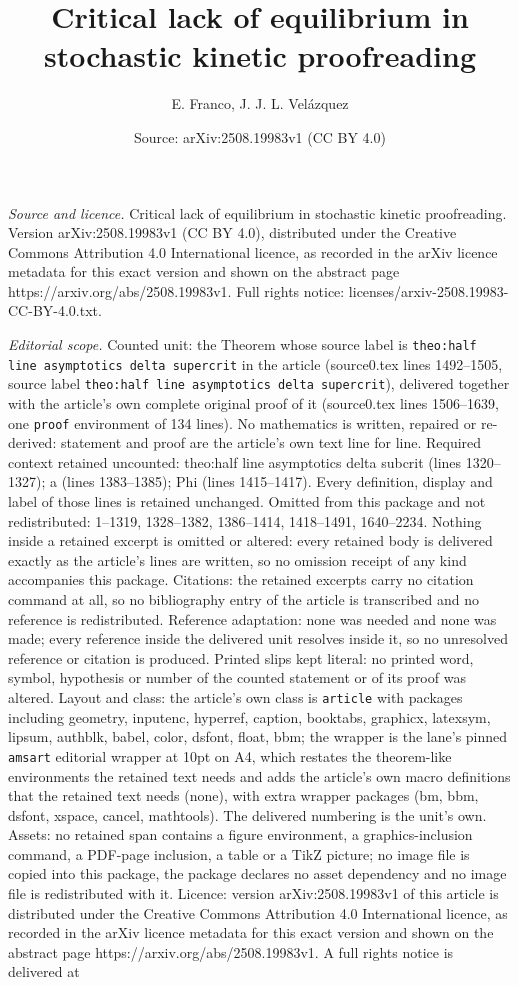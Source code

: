 \documentclass[10pt,a4paper]{amsart}
\title[Critical lack of equilibrium in stochastic kinetic proofread]{Critical lack of equilibrium in stochastic kinetic proofreading}
\author{E. Franco, J. J. L. Vel\'azquez}
\date{Source: arXiv:2508.19983v1 (CC BY 4.0)}
\begin{document}
\maketitle

\noindent\emph{Source and licence.} Critical lack of equilibrium in stochastic kinetic proofreading. Version arXiv:2508.19983v1 (CC BY 4.0), distributed under the Creative Commons Attribution 4.0 International licence, as recorded in the arXiv licence metadata for this exact version and shown on the abstract page https://arxiv.org/abs/2508.19983v1. Full rights notice: licenses/arxiv-2508.19983-CC-BY-4.0.txt.\par\smallskip

\noindent\textit{Editorial scope.} Counted unit: the Theorem whose source label is \texttt{theo:half line asymptotics delta supercrit} in the article (source0.tex lines 1492--1505, source label \texttt{theo:half line asymptotics delta supercrit}), delivered together with the article's own complete original proof of it (source0.tex lines 1506--1639, one \texttt{proof} environment of 134 lines). No mathematics is written, repaired or re-derived: statement and proof are the article's own text line for line. Required context retained uncounted: theo:half line asymptotics delta subcrit (lines 1320--1327); a (lines 1383--1385); Phi (lines 1415--1417). Every definition, display and label of those lines is retained unchanged. Omitted from this package and not redistributed: 1--1319, 1328--1382, 1386--1414, 1418--1491, 1640--2234. Nothing inside a retained excerpt is omitted or altered: every retained body is delivered exactly as the article's lines are written, so no omission receipt of any kind accompanies this package. Citations: the retained excerpts carry no citation command at all, so no bibliography entry of the article is transcribed and no reference is redistributed. Reference adaptation: none was needed and none was made; every reference inside the delivered unit resolves inside it, so no unresolved reference or citation is produced. Printed slips kept literal: no printed word, symbol, hypothesis or number of the counted statement or of its proof was altered. Layout and class: the article's own class is \texttt{article} with packages including geometry, inputenc, hyperref, caption, booktabs, graphicx, latexsym, lipsum, authblk, babel, color, dsfont, float, bbm; the wrapper is the lane's pinned \texttt{amsart} editorial wrapper at 10pt on A4, which restates the theorem-like environments the retained text needs and adds the article's own macro definitions that the retained text needs (none), with extra wrapper packages (bm, bbm, dsfont, xspace, cancel, mathtools). The delivered numbering is the unit's own. Assets: no retained span contains a figure environment, a graphics-inclusion command, a PDF-page inclusion, a table or a TikZ picture; no image file is copied into this package, the package declares no asset dependency and no image file is redistributed with it. Licence: version arXiv:2508.19983v1 of this article is distributed under the Creative Commons Attribution 4.0 International licence, as recorded in the arXiv licence metadata for this exact version and shown on the abstract page https://arxiv.org/abs/2508.19983v1. A full rights notice is delivered at 
\end{document}
